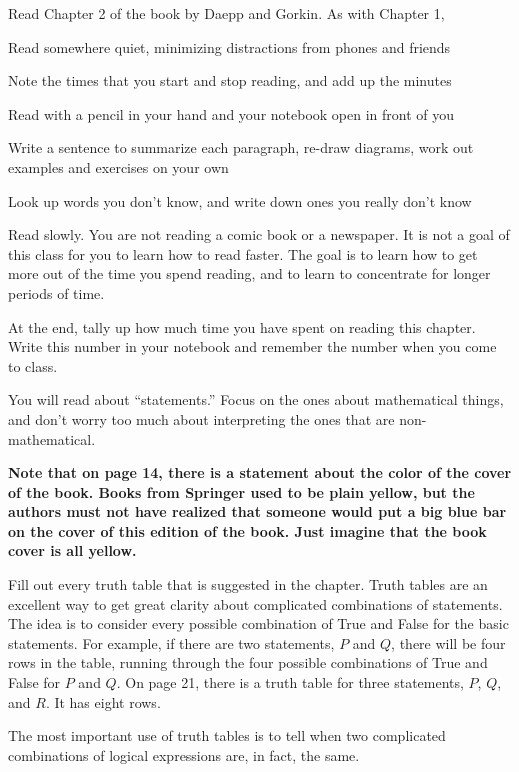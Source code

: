 
Read Chapter 2 of the book by Daepp and Gorkin.
As with Chapter 1,
\blist{0.0in}
\item Read somewhere quiet, minimizing distractions from phones and friends
\item Note the times that you start and stop reading, and add up the minutes
\item Read with a pencil in your hand and your notebook open in front of you
\item Write a sentence to summarize each paragraph, re-draw diagrams, work out examples and exercises on your own
\item Look up words you don't know, and write down ones you really don't know
\item Read slowly.  You are not reading a comic book or a newspaper.  It is not a goal of this class for you to learn how to read faster.  The goal is to learn how to get more out of the time you spend reading, and to learn to concentrate for longer periods of time.
\item At the end, tally up how much time you have spent on reading this chapter.
Write this number in your notebook and remember the number when you come to class.
\elist

You will read about ``statements.''
Focus on the ones about mathematical things, and don't worry too much about interpreting the ones that are non-mathematical.

{\bf Note that on page 14, there is a statement about the color of the cover of the book.  Books from Springer used to be plain yellow, but the authors must not have realized that someone would put a big blue bar on the cover of this edition of the book.  Just imagine that the book cover is all yellow.}

Fill out every truth table that is suggested in the chapter.
Truth tables are an excellent way to get great clarity about complicated combinations of statements.
The idea is to consider every possible combination of True and False for the basic statements.
For example, if there are two statements, $P$ and $Q$, there will be four rows in the table, running through the four possible combinations of True and False for $P$ and $Q$.
On page 21, there is a truth table for three statements, $P$, $Q$, and $R$.
It has eight rows.

The most important use of truth tables is to tell when two complicated combinations of logical expressions are, in fact, the same.

